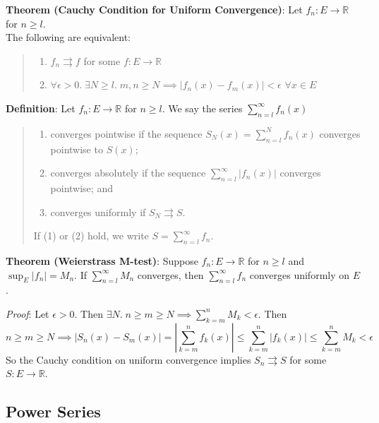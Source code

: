 \documentclass[11pt]{article}
\begin{document}
\textbf{Theorem (Cauchy Condition for Uniform Convergence)}: Let $f_n : E \to \mathbb{R}$ for $n \geq l$.\\
The following are equivalent:
\begin{quote}\vspace{-0.3cm}
	\begin{enumerate}
	\item $f_n \rightrightarrows f$ for some $f : E \to \mathbb{R}$
	\item $\forall \epsilon > 0.\; \exists N \geq l.\; m,n \geq N \implies |f_n(x) - f_m(x)| < \epsilon$ $\forall x \in E$
	\end{enumerate}
\end{quote}

\textbf{Definition}: Let $f_n : E \to \mathbb{R}$ for $n \geq l$. We say the series $\sum_{n=l}^\infty f_n(x)$
\begin{quote}\vspace{-0.3cm}
	\begin{enumerate}
	\item converges pointwise if the sequence $S_N(x) = \sum_{n=l}^N f_n(x)$ converges pointwise to $S(x)$;
	\item converges absolutely if the sequence $\sum_{n=l}^\infty |f_n(x)|$ converges pointwise; and
	\item converges uniformly if $S_N \rightrightarrows S$.
	\end{enumerate}
	If (1) or (2) hold, we write $S = \sum_{n=l}^\infty f_n$.
\end{quote}

\textbf{Theorem (Weierstrass M-test)}: Suppose $f_n : E \to \mathbb{R}$ for $n \geq l$ and $\sup_E |f_n| = M_n$. If $\sum_{n=l}^\infty M_n$ converges, then $\sum_{n=l}^\infty f_n$ converges uniformly on $E$.

\emph{Proof}: Let $\epsilon > 0$. Then $\exists N.\; n \geq m \geq N \implies \sum_{k=m}^n M_k < \epsilon$. Then
\begin{displaymath}
n \geq m \geq N \implies |S_n(x) - S_m(x)| = \left|\sum_{k=m}^n f_k(x)\right| \leq \sum_{k=m}^n |f_k(x)| \leq \sum_{k=m}^n M_k < \epsilon
\end{displaymath}
So the Cauchy condition on uniform convergence implies $S_n \rightrightarrows S$ for some $S : E \to \mathbb{R}$.

\subsection{Power Series}
\end{document}
